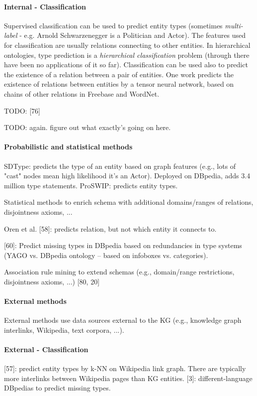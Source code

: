 \paragraph{Internal - Classification}
Supervised classification can be used to predict entity types (sometimes
\textit{multi-label} - e.g. Arnold Schwarzenegger is a Politician and Actor).
The features used for classification are usually relations connecting to other
entities. In hierarchical ontologies, type prediction is a \textit{hierarchical
classification} problem (through there have been no applications of it so far).
Classification can be used also to predict the existence of a relation between
a pair of entities.
One work predicts the existence of relations between entities by a tensor
neural network, based on chains of other
relations in Freebase and WordNet.\cite{neural-tensor-networks-for-kbc}

TODO: [76]

TODO: again. figure out what exactly's going on here.

\paragraph{Probabilistic and statistical methods}
SDType: predicts the type of an entity based on graph features (e.g., lots of
"cast" nodes mean high likelihood it's an Actor). Deployed on DBpedia, adds 3.4
million type statements.
ProSWIP: predicts entity types.

Statistical methods to enrich schema with additional domains/ranges of
relations, disjointness axioms, ...

Oren et al. [58]: predicts relation, but not which entity it connects to.

[60]: Predict missing types in DBpedia based on redundancies in type systems
(YAGO vs. DBpedia ontology -- based on infoboxes vs. categories).

Association rule mining to extend schemas (e.g., domain/range restrictions,
disjointness axioms, ...) [80, 20]

\paragraph{External methods}
External methods use data sources external to the KG (e.g., knowledge graph
interlinks, Wikipedia, text corpora, ...).

\paragraph{External - Classification}
[57]: predict entity types by k-NN on Wikipedia link graph.
There are typically more interlinks between Wikipedia pages than KG entities.
[3]: different-language DBpedias to predict missing types.

